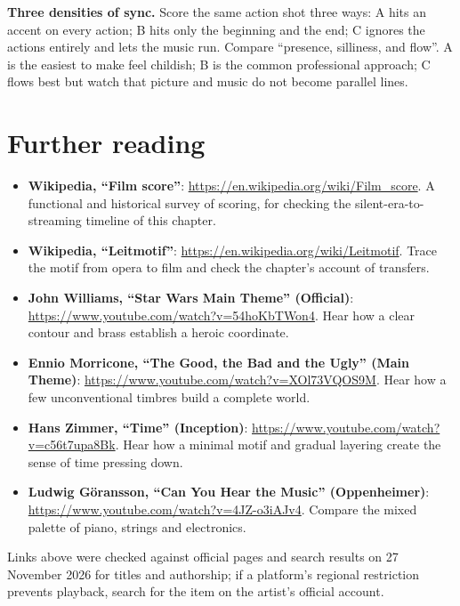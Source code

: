 \begin{exercise}
\textbf{Three densities of sync.} Score the same action shot three ways: A hits an accent on every action; B hits only the beginning and the end; C ignores the actions entirely and lets the music run. Compare ``presence, silliness, and flow''. A is the easiest to make feel childish; B is the common professional approach; C flows best but watch that picture and music do not become parallel lines.
\end{exercise}

\section{Further reading}
\label{sec:film-reading}

\begin{sloppypar}
\begin{itemize}
\item \textbf{Wikipedia, ``Film score''}: \url{https://en.wikipedia.org/wiki/Film_score}. A functional and historical survey of scoring, for checking the silent-era-to-streaming timeline of this chapter.
\item \textbf{Wikipedia, ``Leitmotif''}: \url{https://en.wikipedia.org/wiki/Leitmotif}. Trace the motif from opera to film and check the chapter's account of transfers.
\item \textbf{John Williams, ``Star Wars Main Theme'' (Official)}: \url{https://www.youtube.com/watch?v=54hoKbTWon4}. Hear how a clear contour and brass establish a heroic coordinate.
\item \textbf{Ennio Morricone, ``The Good, the Bad and the Ugly'' (Main Theme)}: \url{https://www.youtube.com/watch?v=XOl73VQOS9M}. Hear how a few unconventional timbres build a complete world.
\item \textbf{Hans Zimmer, ``Time'' (Inception)}: \url{https://www.youtube.com/watch?v=c56t7upa8Bk}. Hear how a minimal motif and gradual layering create the sense of time pressing down.
\item \textbf{Ludwig Göransson, ``Can You Hear the Music'' (Oppenheimer)}: \url{https://www.youtube.com/watch?v=4JZ-o3iAJv4}. Compare the mixed palette of piano, strings and electronics.
\end{itemize}
\end{sloppypar}

Links above were checked against official pages and search results on 27 November 2026 for titles and authorship; if a platform's regional restriction prevents playback, search for the item on the artist's official account.

